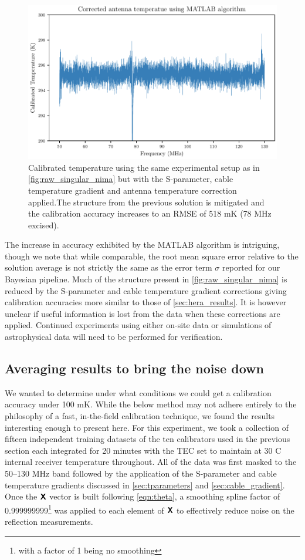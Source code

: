 \begin{figure}
    \centering
    \includegraphics[width=.8\textwidth]{corrected_matlab_solution}
    \caption{Calibrated temperature using the same experimental setup as in \cref{fig:raw_singular_nima} but with the S-parameter, cable temperature gradient and antenna temperature correction applied.The structure from the previous solution is mitigated and the calibration accuracy increases to an RMSE of 518 mK (78 MHz excised).}
    \label{fig:corrected_singular_nima}
\end{figure}

The increase in accuracy exhibited by the MATLAB algorithm is intriguing, though we note that while comparable, the root mean square error relative to the solution average is not strictly the same as the error term $\sigma$ reported for our Bayesian pipeline. Much of the structure present in \cref{fig:raw_singular_nima} is reduced by the S-parameter and cable temperature gradient corrections giving calibration accuracies more similar to those of \cref{sec:hera_results}. It is however unclear if useful information is lost from the data when these corrections are applied. Continued experiments using either on-site data or simulations of astrophysical data will need to be performed for verification.

\subsection{Averaging results to bring the noise down}\label{matlab_avg_results}
We wanted to determine under what conditions we could get a calibration accuracy under 100 mK. While the below method may not adhere entirely to the philosophy of a fast, in-the-field calibration technique, we found the results interesting enough to present here. For this experiment, we took a collection of fifteen independent training datasets of the ten calibrators used in the previous section each integrated for 20 minutes with the TEC set to maintain at 30 \textdegree C internal receiver temperature throughout. All of the data was first masked to the 50--130 MHz band followed by the application of the S-parameter and cable temperature gradients discussed in \cref{sec:tparameters} and \cref{sec:cable_gradient}. Once the $\textbf{\textsf{X}}$ vector is built following \cref{eqn:theta}, a smoothing spline factor of 0.999999999\footnote{with a factor of 1 being no smoothing} was applied to each element of $\textbf{\textsf{X}}$ to effectively reduce noise on the reflection measurements.

